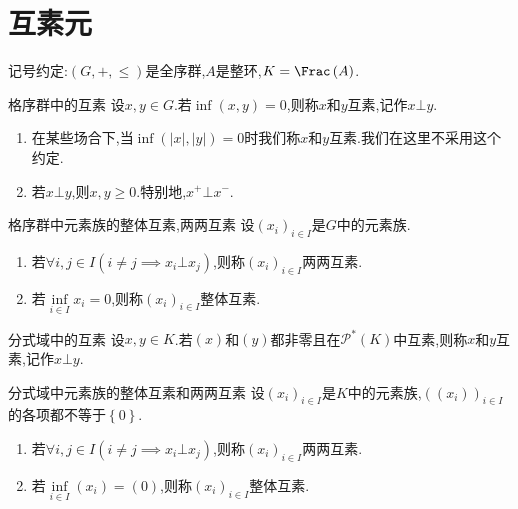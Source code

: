 \section{互素元}

记号约定:$\left(G,+,\leq\right)$是全序群,$A$是整环,$K=\Frac\left(A\right)$.

\begin{definition}{格序群中的互素}{}
	设$x,y\in G$.若$\inf\left(x,y\right)=0$,则称$x$和$y$互素,记作$x\bot y$.
\end{definition}

\begin{remark}{}{}
	\begin{enumerate}
		\item 在某些场合下,当$\inf\left(\left|x\right|,\left|y\right|\right)=0$时我们称$x$和$y$互素.我们在这里不采用这个约定.
		\item 若$x\bot y$,则$x,y\geq 0$.特别地,$x^{+}\bot x^{-}$.
	\end{enumerate}
\end{remark}

\begin{definition}{格序群中元素族的整体互素,两两互素}{}
	设$\left(x_{i}\right)_{i\in I}$是$G$中的元素族.
	\begin{enumerate}
		\item 若$\forall i,j\in I\left(i\neq j\implies x_{i}\bot x_{j}\right)$,则称$\left(x_{i}\right)_{i\in I}$两两互素.
		\item 若$\inf\limits_{i\in I}x_{i}=0$,则称$\left(x_{i}\right)_{i\in I}$整体互素.
	\end{enumerate}
\end{definition}

\begin{definition}{分式域中的互素}{}
	设$x,y\in K$.若$\left(x\right)$和$\left(y\right)$都非零且在$\mathscr{P}^{\ast}\left(K\right)$中互素,则称$x$和$y$互素,记作$x\bot y$.
\end{definition}

\begin{definition}{分式域中元素族的整体互素和两两互素}{}
	设$\left(x_{i}\right)_{i\in I}$是$K$中的元素族,$\left(\left(x_{i}\right)\right)_{i\in I}$的各项都不等于$\left\{0\right\}$.
	\begin{enumerate}
		\item 若$\forall i,j\in I\left(i\neq j\implies x_{i}\bot x_{j}\right)$,则称$\left(x_{i}\right)_{i\in I}$两两互素.
		\item 若$\inf\limits_{i\in I}\left(x_{i}\right)=\left(0\right)$,则称$\left(x_{i}\right)_{i\in I}$整体互素.
	\end{enumerate}
\end{definition}

